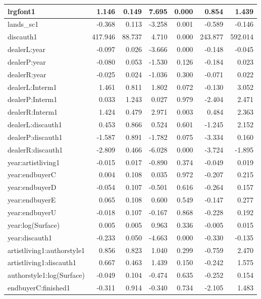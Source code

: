 \documentclass[]{article}
\begin{document}
\begin{table}[!h]
\begin{tabular}[t]{l|r|r|r|r|r|r}
\hline
lrgfont1 & 1.146 & 0.149 & 7.695 & 0.000 & 0.854 & 1.439\\
\hline
lands\_sc1 & -0.368 & 0.113 & -3.258 & 0.001 & -0.589 & -0.146\\
\hline
discauth1 & 417.946 & 88.737 & 4.710 & 0.000 & 243.877 & 592.014\\
\hline
dealerL:year & -0.097 & 0.026 & -3.666 & 0.000 & -0.148 & -0.045\\
\hline
dealerP:year & -0.080 & 0.053 & -1.530 & 0.126 & -0.184 & 0.023\\
\hline
dealerR:year & -0.025 & 0.024 & -1.036 & 0.300 & -0.071 & 0.022\\
\hline
dealerL:Interm1 & 1.461 & 0.811 & 1.802 & 0.072 & -0.130 & 3.052\\
\hline
dealerP:Interm1 & 0.033 & 1.243 & 0.027 & 0.979 & -2.404 & 2.471\\
\hline
dealerR:Interm1 & 1.424 & 0.479 & 2.971 & 0.003 & 0.484 & 2.363\\
\hline
dealerL:discauth1 & 0.453 & 0.866 & 0.524 & 0.601 & -1.245 & 2.152\\
\hline
dealerP:discauth1 & -1.587 & 0.891 & -1.782 & 0.075 & -3.334 & 0.160\\
\hline
dealerR:discauth1 & -2.809 & 0.466 & -6.028 & 0.000 & -3.724 & -1.895\\
\hline
year:artistliving1 & -0.015 & 0.017 & -0.890 & 0.374 & -0.049 & 0.019\\
\hline
year:endbuyerC & 0.004 & 0.108 & 0.035 & 0.972 & -0.207 & 0.215\\
\hline
year:endbuyerD & -0.054 & 0.107 & -0.501 & 0.616 & -0.264 & 0.157\\
\hline
year:endbuyerE & 0.065 & 0.108 & 0.600 & 0.549 & -0.147 & 0.277\\
\hline
year:endbuyerU & -0.018 & 0.107 & -0.167 & 0.868 & -0.228 & 0.192\\
\hline
year:log(Surface) & 0.005 & 0.005 & 0.963 & 0.336 & -0.005 & 0.015\\
\hline
year:discauth1 & -0.233 & 0.050 & -4.663 & 0.000 & -0.330 & -0.135\\
\hline
artistliving1:authorstyle1 & 0.856 & 0.823 & 1.040 & 0.299 & -0.759 & 2.470\\
\hline
artistliving1:discauth1 & 0.667 & 0.463 & 1.439 & 0.150 & -0.242 & 1.575\\
\hline
authorstyle1:log(Surface) & -0.049 & 0.104 & -0.474 & 0.635 & -0.252 & 0.154\\
\hline
endbuyerC:finished1 & -0.311 & 0.914 & -0.340 & 0.734 & -2.105 & 1.483\\

\end{tabular}
\end{table}
\end{document}
